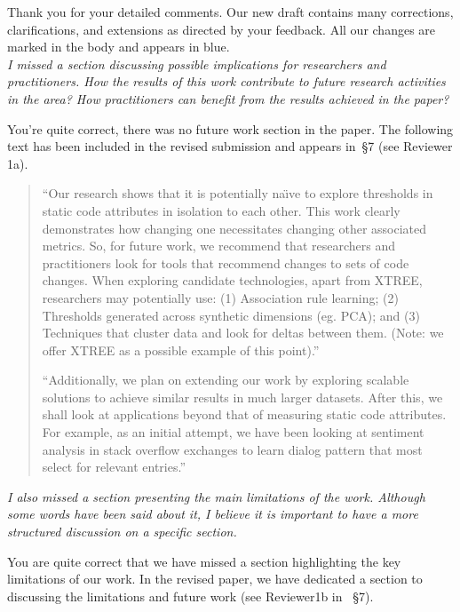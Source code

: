 \documentclass[twocolumn,5p]{elsarticle}
\newcommand{\tion}[1]{\S#1}
\newcommand{\review}[1]{\noindent\textit{#1\\}}
\theoremstyle{break}
\begin{document}
Thank you for your detailed comments. Our new draft contains many 
corrections, clarifications, and extensions as directed by your feedback.
All our changes are marked in the body and appears in {\color{steel} 
	blue}.\\

\review{I missed a section discussing possible implications for 
	researchers 
	and practitioners. How the results of this work contribute to future 
	research activities in the area? How practitioners can benefit from the 
	results achieved in the paper?}


You're quite correct, there was no future work section in the paper. The
following text
has been included in the revised submission and appears in~\tion{7} 
(see {\color{steel} Reviewer 1a}). 


\begin{quote}``Our research shows that it is potentially na\"{\i}ve to explore 
	thresholds in static code attributes in isolation to each other. 
	This work clearly demonstrates how changing one necessitates changing 
	other associated metrics. So, for future work, we recommend that 
	researchers and practitioners look for tools that recommend changes to sets 
	of code changes. When exploring candidate technologies, apart from XTREE, 
	researchers may potentially use: (1) Association rule learning; (2) 
	Thresholds generated across synthetic dimensions (eg. PCA); and (3) 
	Techniques that cluster data and look for deltas between them. (Note: we 
	offer XTREE as a possible example of this point).''
	
	``Additionally, we plan on extending our work by exploring scalable 
	solutions 
	to achieve similar results in much larger datasets. After this, we shall 
	look at applications beyond that of measuring static 
	code attributes. For example, as an initial attempt, we have been looking 
	at sentiment analysis in stack overflow exchanges to learn dialog pattern 
	that most select for relevant entries.''
\end{quote}


\review{I also missed a section presenting the main limitations of 
	the 
	work. Although some words have been said about it, I believe it is 
	important to have a more structured discussion on a specific section.}

You are quite correct that we have missed a section highlighting the key 
limitations of our work. In the revised paper, we have dedicated a section 
to discussing the 
limitations and future work (see {\color{steel} Reviewer1b} in 
~\tion{7}).\\
\end{document}

